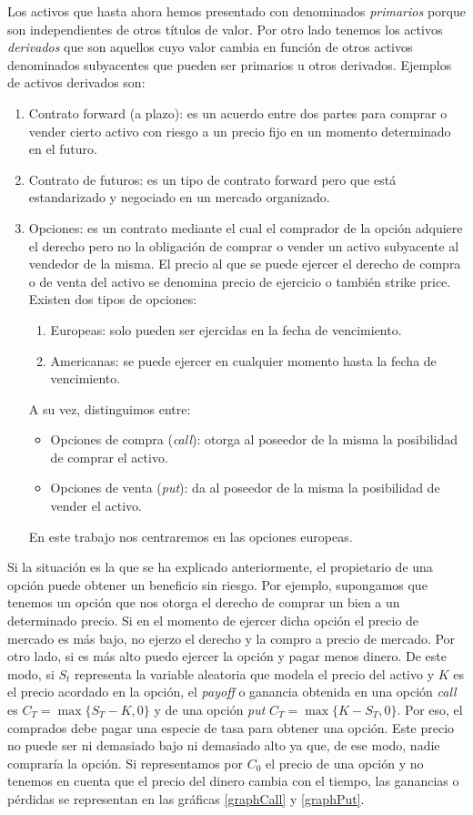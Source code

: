 Los activos que hasta ahora hemos presentado con denominados \textit{primarios} porque son independientes de otros títulos de valor. Por otro lado tenemos los activos \textit{derivados} que son aquellos cuyo valor cambia en función de otros activos denominados subyacentes que pueden ser primarios u otros derivados. Ejemplos de activos derivados son:
\begin{enumerate}
\item Contrato forward (a plazo): es un acuerdo entre dos partes para comprar o vender cierto activo con riesgo a un precio fijo en un momento determinado en el futuro. 
\item Contrato de futuros: es un tipo de contrato forward pero que está estandarizado y negociado en un mercado organizado.
\item Opciones: es un contrato mediante el cual el comprador de la opción adquiere el derecho pero no la obligación de comprar o vender un activo subyacente al vendedor de la misma. El precio al que se puede ejercer el derecho de compra o de venta del activo se denomina precio de ejercicio o también strike price. Existen dos tipos de opciones: 
\begin{enumerate}
	\item Europeas: solo pueden ser ejercidas en la fecha de vencimiento.
	\item Americanas:  se puede ejercer en cualquier momento hasta la fecha de vencimiento.
\end{enumerate}
A su vez, distinguimos entre:
\begin{itemize}
	\item Opciones de compra (\textit{call}): otorga al poseedor de la misma la posibilidad de comprar el activo.
	\item Opciones de venta (\textit{put}): da al poseedor de la misma la posibilidad de vender el activo.
\end{itemize}

En este trabajo nos centraremos en las opciones europeas. 
\end{enumerate} 

Si la situación es la que se ha explicado anteriormente, el propietario de una opción puede obtener un beneficio sin riesgo. Por ejemplo, supongamos que tenemos un opción que nos otorga el derecho de comprar un bien a un determinado precio. Si en el momento de ejercer dicha opción el precio de mercado es más bajo, no ejerzo el derecho y la compro a precio de mercado. Por otro lado, si es más alto puedo ejercer la opción y pagar menos dinero. De este modo, si $ S_t $ representa la variable aleatoria que modela el precio del activo y $ K $ es el precio acordado en la opción, el \textit{payoff} o ganancia obtenida en una opción \textit{call} es $ C_T = \max\{S_T-K, 0\} $ y de una opción \textit{put} $ C_T = \max\{K-S_T, 0\}  $. Por eso, el comprados debe pagar una especie de tasa para obtener una opción. Este precio no puede ser ni demasiado bajo ni demasiado alto ya que, de ese modo, nadie compraría la opción. Si representamos por $ C_0 $ el precio de una opción y no tenemos en cuenta que el precio del dinero cambia con el tiempo, las ganancias o pérdidas se representan en las gráficas \ref{graphCall} y \ref{graphPut}. \\

